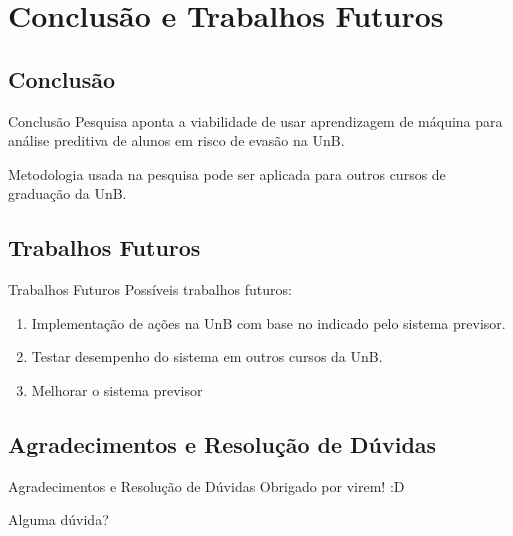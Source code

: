 \section{Conclusão e Trabalhos Futuros}
\subsection{Conclusão}
\begin{frame}{Conclusão}
    Pesquisa aponta a viabilidade de usar aprendizagem de máquina para análise
    preditiva de alunos em risco de evasão na UnB. 

    \vspace{0.5cm}

    Metodologia usada na pesquisa pode ser aplicada para outros cursos de graduação
    da UnB. 
\end{frame}

\subsection{Trabalhos Futuros}
\begin{frame}{Trabalhos Futuros}
    Possíveis trabalhos futuros: 
    \begin{enumerate}
        \item Implementação de ações na UnB com base no indicado pelo sistema
            previsor. 
        \item Testar desempenho do sistema em outros cursos da UnB. 
        \item Melhorar o sistema previsor
    \end{enumerate}
\end{frame}

\subsection{Agradecimentos e Resolução de Dúvidas}
\begin{frame}{Agradecimentos e Resolução de Dúvidas}
    Obrigado por virem! :D 

    \vspace{0.5cm}

    Alguma dúvida?
\end{frame}
